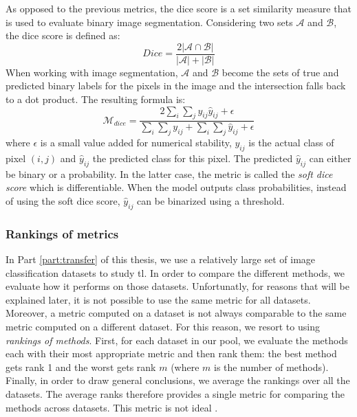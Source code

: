 As opposed to the previous metrics, the dice score is a set similarity measure
that is used to evaluate binary image segmentation. Considering two sets $\mathcal{A}$
and $\mathcal{B}$, the dice score is defined as:
\begin{equation}
\label{eqn:backml:diceAB}
Dice = \frac{2 \left|\mathcal{A}\cap \mathcal{B}\right|}{\left|\mathcal{A}\right| + \left|\mathcal{B}\right|}
\end{equation}
When working with image segmentation, $\mathcal{A}$ and $\mathcal{B}$ become the
sets of true and predicted binary labels for the pixels in the image and the
intersection falls back to a dot product. The resulting formula is:
\begin{equation}
\label{eqn:backml:dice}
\mathcal{M}_{dice} = \dfrac{2 \sum_i\sum_j y_{ij} \hat{y}_{ij} + \epsilon}{\sum_i\sum_j y_{ij} + \sum_i\sum_j \hat{y}_{ij} + \epsilon}
\end{equation}
where $\epsilon$ is a small value added for numerical stability, $y_{ij}$ is the
actual class of pixel $(i, j)$ and $\hat{y}_{ij}$ the predicted class for this
pixel. The predicted $\hat{y}_{ij}$ can either be binary or a probability. In the
latter case, the metric is called the \textit{soft dice score} which is differentiable.
When the model outputs class probabilities, instead of using the soft dice score,
$\hat{y}_{ij}$ can be binarized using a threshold.

\subsubsection{Rankings of metrics}
\label{ssec:backml:metric:rankings}

In Part \ref{part:transfer} of this thesis, we use a relatively large set of image
classification datasets to study \acrlong{tl}. In order to compare the different
methods, we evaluate how it performs on those datasets. Unfortunatly, for reasons
that will be explained later, it is not possible to use the same metric for all
datasets. Moreover, a metric computed on a dataset is not always comparable to
the same metric computed on a different dataset. For this reason, we resort to
using \textit{rankings of methods}. First, for each dataset in our pool, we evaluate
the methods each with their most appropriate metric and then rank them: the best
method gets rank 1 and the worst gets rank $m$ (where $m$ is the number of methods).
Finally, in order to draw general conclusions, we average the rankings over all
the datasets. The average ranks therefore provides a single metric for comparing
the methods across datasets. This metric is not ideal
.

